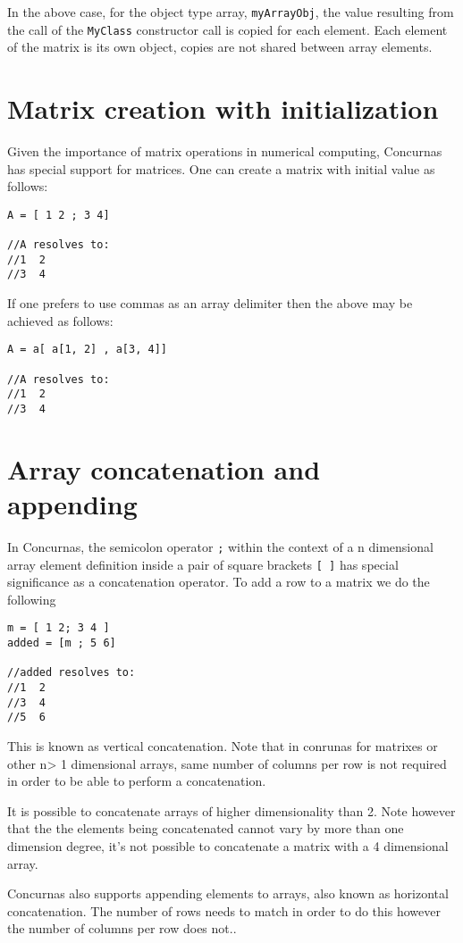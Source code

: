 \documentclass[conc-doc]{subfiles}
\begin{document}
In the above case, for the object type array, \lstinline{myArrayObj}, the value resulting from the call of the \lstinline{MyClass} constructor call is copied for each element. Each element of the matrix is its own object, copies are not shared between array elements.

\section{Matrix creation with initialization}
Given the importance of matrix operations in numerical computing, Concurnas has special support for matrices. One can create a matrix with initial value as follows:
\begin{lstlisting}
A = [ 1 2 ; 3 4]

//A resolves to:
//1  2
//3  4
\end{lstlisting}

If one prefers to use commas as an array delimiter then the above may be achieved as follows:
\begin{lstlisting}
A = a[ a[1, 2] , a[3, 4]]

//A resolves to:
//1  2
//3  4
\end{lstlisting}

\section{Array concatenation and appending}
In Concurnas, the semicolon operator \lstinline{;} within the context of a n dimensional array element definition inside a pair of square brackets \lstinline{[ ]} has special significance as a concatenation operator. To add a row to a matrix we do the following
\begin{lstlisting}
m = [ 1 2; 3 4 ]
added = [m ; 5 6]

//added resolves to:
//1	 2
//3	 4
//5  6
\end{lstlisting}

This is known as vertical concatenation. Note that in conrunas for matrixes or other n> 1 dimensional arrays, same number of columns per row is not required in order to be able to perform a concatenation.

It is possible to concatenate arrays of higher dimensionality than 2. Note however that the the elements being concatenated cannot vary by more than one dimension degree, it's not possible to concatenate a matrix with a 4 dimensional array.

Concurnas also supports appending elements to arrays, also known as horizontal concatenation. The number of rows needs to match in order to do this however the number of columns per row does not..
\end{document}
